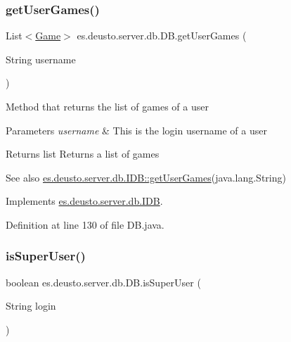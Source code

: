 \subsubsection{\texorpdfstring{get\+User\+Games()}{getUserGames()}}
{\footnotesize\ttfamily List$<$\hyperlink{classes_1_1deusto_1_1server_1_1db_1_1data_1_1_game}{Game}$>$ es.\+deusto.\+server.\+db.\+D\+B.\+get\+User\+Games (\begin{DoxyParamCaption}\item[{String}]{username }\end{DoxyParamCaption})}

Method that returns the list of games of a user 
\begin{DoxyParams}{Parameters}
{\em username} & This is the login username of a user \\
\hline
\end{DoxyParams}
\begin{DoxyReturn}{Returns}
list Returns a list of games 
\end{DoxyReturn}
\begin{DoxySeeAlso}{See also}
\hyperlink{interfacees_1_1deusto_1_1server_1_1db_1_1_i_d_b_ac5ef9780a640140576f9373f8b57631c}{es.\+deusto.\+server.\+db.\+I\+D\+B\+::get\+User\+Games}(java.\+lang.\+String) 
\end{DoxySeeAlso}


Implements \hyperlink{interfacees_1_1deusto_1_1server_1_1db_1_1_i_d_b_ac5ef9780a640140576f9373f8b57631c}{es.\+deusto.\+server.\+db.\+I\+DB}.



Definition at line 130 of file D\+B.\+java.

\mbox{\label{classes_1_1deusto_1_1server_1_1db_1_1_d_b_a53a59425c7690f07861fd5d006f83cbc}} 
\subsubsection{\texorpdfstring{is\+Super\+User()}{isSuperUser()}}
{\footnotesize\ttfamily boolean es.\+deusto.\+server.\+db.\+D\+B.\+is\+Super\+User (\begin{DoxyParamCaption}\item[{String}]{login }\end{DoxyParamCaption})}

